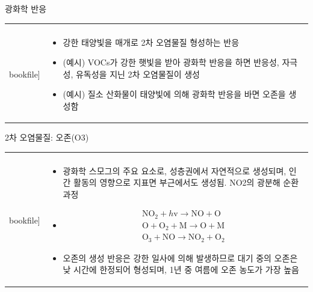 \begin{frame}[t]{광화학 반응}
	\begin{tabular}{ll}
		\begin{minipage}[t]{0.6\textwidth}\scriptsize
			\begin{figure}[t]
				\texttt{[image: \\bookfile]}
			\end{figure}
		\end{minipage}	
		&
		\begin{minipage}[t]{0.35\textwidth} \scriptsize	
			\begin{itemize}
				\item 강한 태양빛을 매개로 2차 오염물질 형성하는 반응
				\item (예시) VOCs가 강한 햇빛을 받아 광화학 반응을 하면 반응성, 자극성, 유독성을 지닌 2차 오염물질이 생성
				\item (예시) 질소 산화물이 태양빛에 의해 광화학 반응을 바면 오존을 생성함
				
					
			\end{itemize}

		\end{minipage}
	\end{tabular}
\end{frame}



\begin{frame}[t]{2차 오염물질: 오존(O3)	}
	\begin{tabular}{ll}
		\begin{minipage}[t]{0.3\textwidth}\scriptsize
			\begin{figure}[t]
				\texttt{[image: \\bookfile]}
			\end{figure}
		\end{minipage}	
		&
		\begin{minipage}[t]{0.65\textwidth} \scriptsize	
			\begin{itemize}
				\item 광화학 스모그의 주요 요소로, 성층권에서 자연적으로 생성되며, 인간 활동의 영향으로 지표면 부근에서도 생성됨.
				NO2의 광분해 순환과정
				\item $$
					\begin{array}{l}
					\mathrm{NO}_{2}+h \mathrm{v} \rightarrow \mathrm{NO}+\mathrm{O} \\
					\mathrm{O}+\mathrm{O}_{2}+\mathrm{M} \rightarrow \mathrm{O}+\mathrm{M} \\
					\mathrm{O}_{3}+\mathrm{NO} \rightarrow \mathrm{NO}_{2}+\mathrm{O}_{2}
					\end{array}
				$$
				\item 오존의 생성 반응은 강한 일사에 의해 발생하므로 대기 중의 오존은 낮 시간에 한정되어 형성되며, 1년 중 여름에 오존 농도가 가장 높음
					
			\end{itemize}

		\end{minipage}
	\end{tabular}
\end{frame}

